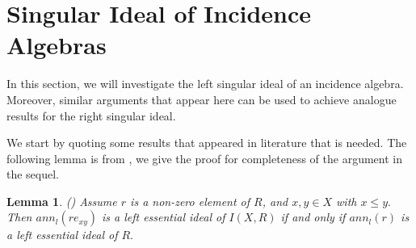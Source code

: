 \documentclass[12pt]{article}
\newtheorem{lemma}[theorem]{Lemma}
\begin{document}
\section{Singular Ideal of Incidence Algebras}


In this section, we will investigate the left singular ideal of an incidence algebra.  %
Moreover, similar arguments that appear here can be used to achieve analogue results for the right singular ideal. 


We start by quoting some results that appeared in literature that is needed. 
The following lemma is from \cite{Trio:CharIncAlg}, we give the proof for
completeness of the argument in the sequel. 

\begin{lemma}
\label{lemma 1.3} (\cite[Lemma 11]{Trio:CharIncAlg}) Assume $r$ is a
non-zero element of $R$, and $x,y\in X$ with $x\leq y. $ Then $%
ann_l(re_{xy}) $ is a left essential ideal of $I(X,R)$ if and only if $%
ann_l(r)$ is a left essential ideal of $R.$
\end{lemma}
\end{document}
